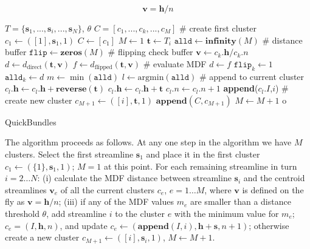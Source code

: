 \documentclass{bioinfo}
\begin{document}
\begin{methods}
\begin{equation}
  \mathbf{v} = \mathbf{h} / n
\end{equation}

\begin{algorithm}[h]
\begin{algorithmic}
\REQUIRE $T=\{\mathbf{s}_{1},...,\mathbf{s}_{i},...,\mathbf{s}_{N}\}$, $\theta$
\ENSURE $C=[c_{1},...,c_{k},...,c_{M}]$ 
\STATE \# create first cluster
\STATE $c_{1} \leftarrow ([1],\mathbf{s}_{1},1)$
\STATE $C\leftarrow[c_{1}]$
\STATE $M\leftarrow1$ 
	\STATE $\textbf{t}\leftarrow T_{i}$
	\STATE $\texttt{alld}\leftarrow\textbf{infinity}(M)$ \# distance buffer
	\STATE $\texttt{flip}\leftarrow\textbf{zeros}(M)$ \# flipping check buffer
		\STATE $\mathbf{v}\leftarrow c_{k}.\mathbf{h}/c_{k}.n$
		\STATE $d\leftarrow d_{\textrm{direct}}(\mathbf{t},\mathbf{v})$
		\STATE $f\leftarrow d_{\textrm{flipped}}(\mathbf{t},\mathbf{v})$
	\STATE \# evaluate MDF
		\STATE $d \leftarrow f$
		\STATE $\texttt{flip}_{k} \leftarrow 1$
	\ENDIF
	\STATE $\texttt{alld}_{k} \leftarrow d$
	\ENDFOR
\STATE $m\leftarrow \min(\texttt{alld})$
\STATE $l\leftarrow \mathrm{arg min}(\texttt{alld})$
\STATE \# append to current cluster
		\STATE $c_{l}.\mathbf{h} \leftarrow c_{l}.\mathbf{h} + \textbf{reverse}(\textbf{t})$
	\ELSE
		\STATE $c_{l}.\mathbf{h} \leftarrow c_{l}.\mathbf{h} + \textbf{t}$
	\ENDIF
	\STATE $c_{l}.n \leftarrow c_{l}.n + 1$
	\STATE \textbf{append}($c_{l}.I$,$i$)
\ELSE 
\STATE \# create new cluster
        \STATE $c_{M+1} \leftarrow ([i],\mathbf{t},1)$
        \STATE $\mathbf{append}(C,c_{M+1})$
	\STATE $M\leftarrow M+1$
\ENDIF
o\ENDFOR 
\end{algorithmic}
\caption{QuickBundles}
\label{Alg:QuickBundles}
\end{algorithm}

The algorithm proceeds as follows.  At any one step in the algorithm we
have $M$ clusters. Select the first streamline $\mathbf{s}_{1}$ and
place it in the first cluster $c_{1}\leftarrow(\{1\},\mathbf{s}_{1},1)$;
$M=1$ at this point.  For each remaining streamline in turn $i = 2 \dots
N$: (i) calculate the MDF distance between streamline $\mathbf{s}_{i}$
and the centroid streamlines $\mathbf{v}_{e}$ of all the current clusters
$c_{e}$, $e = 1 \dots M$, where $\mathbf{v}$ is defined on the fly as
$\mathbf{v}=\mathbf{h}/n$; (iii) if any of the MDF values $m_{e}$ are
smaller than a distance threshold $\theta$, add streamline $i$ to the
cluster $e$ with the minimum value for $m_{e}$;
$c_{e}=(I,\mathbf{h},n)$, and update
$c_{e}\leftarrow(\mathbf{append}(I,i),\mathbf{h}+\mathbf{s},n+1)$;
otherwise create a new cluster
$c_{M+1}\leftarrow([i],\mathbf{s}_{i},1)$, $M\leftarrow M+1$.


\end{methods}
\end{document}
